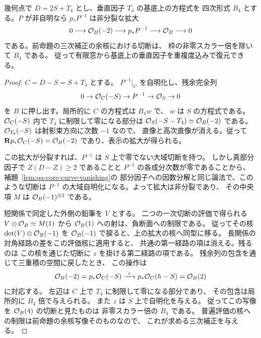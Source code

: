 \begin{corollary}[重複負断面の四次形式の復元]
\label{cor:qa-avatar-double-negative-quartic}
幾何点で $D=2S+T_4$ とし、垂直因子 $T_4$ の基底上の方程式を
四次形式 $B_4$ とする。$P$ が非自明なら
$p_*P^{-1}$ は非分裂な拡大
\[
 0\longrightarrow\mathcal O_B(-2)\longrightarrow p_*P^{-1}
                 \longrightarrow\mathcal O_B\longrightarrow0
\]
である。前命題の三次補正の余核における切断は、
枠の非零スカラー倍を除いて $B_4$ である。
従って有限窓から基底上の垂直因子を重複度込みで復元できる。
\end{corollary}
\begin{proof}
$C=D-S=S+T_4$ とする。
$P^{-1}|_C$ を自明化し、残余完全列
\[
 0\to\mathcal O_C(-S)\to P^{-1}\to\mathcal O_S\to0
\]
を $B$ に押し出す。局所的に $C$ の方程式は $B_4w$ で、
$w$ は $S$ の方程式である。
$\mathcal O_C(-S)$ 内で $T_4$ に制限して零になる部分は
$\mathcal O_S(-S-T_4)\simeq\mathcal O_B(-2)$ である。
$\mathcal O_{T_4}(-S)$ は射影束方向に次数 $-1$ なので、
直像と高次直像が消える。従って
$\mathbf Rp_*\mathcal O_C(-S)=\mathcal O_B(-2)$ であり、表示の拡大が得られる。

この拡大が分裂すれば、$P^{-1}$ は $S$ 上で零でない大域切断を持つ。
しかし真部分因子で $Z(D-Z)\ge2$ であることと
$P^{-1}$ の各成分次数が零であることから、
補題~\ref{lem:qa-core-curve-vanishing}の
部分因子への因数分解と同じ論法で、このような切断は
$P^{-1}$ の大域自明化になる。よって拡大は非分裂であり、
その中央項 $M$ は $\mathcal O_B(-1)^{\oplus2}$ である。

短関係で同定した外側の鉛筆を $V$ とする。
二つの一次切断の評価で得られる $V\otimes\mathcal O_B\simeq M(1)$
から $\mathcal O_B(1)$ への射は、負断面への制限である。
従ってその核 $\det(V)\otimes\mathcal O_B(-1)$ を
$\mathcal O_B(-1)$ で捩ると、上の拡大の核へ同型に移る。
長関係の対角経路の差をこの評価核に適用すると、
共通の第一経路の項は消える。残るのは
この核を通じた切断に $z$ を掛ける第二経路の項である。
残余列の包含を通じて三重積の空間に戻したとき、
この操作は
\[
 \mathcal O_B(-2)=p_*\mathcal O_C(-S)
     \xrightarrow{\ z\ }p_*\mathcal O_C(h-S)=\mathcal O_B(2)
\]
に対応する。
左辺は $C$ 上で $T_4$ に制限して零になる部分であり、
その包含は局所的に $B_4$ 倍で与えられる。
また $z$ は $S$ 上で自明化を与える。
従ってこの写像を $\mathcal O_B(4)$ の切断と見たものは
非零スカラー倍の $B_4$ である。
普遍評価の核への制限は前命題の余核写像そのものなので、
これが求める三次補正を与える。
\end{proof}

